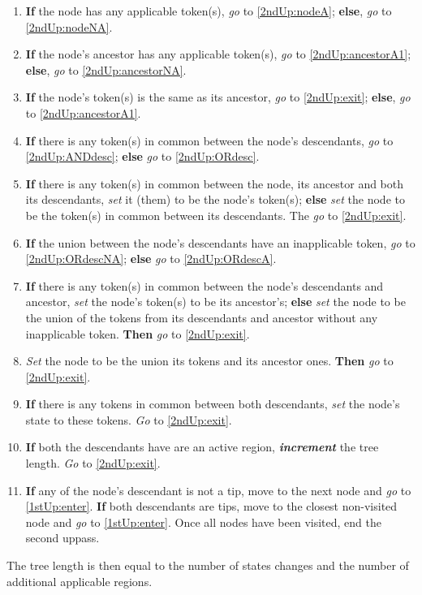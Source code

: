 \documentclass[a4paper,12pt]{article}
\begin{document}
\begin{enumerate}
    \item \label{2ndUp:enter} \textbf{If} the node has any applicable token(s), \textit{go} to \ref{2ndUp:nodeA}; \textbf{else}, \textit{go} to \ref{2ndUp:nodeNA}.
    \item \label{2ndUp:nodeA} \textbf{If} the node's ancestor has any applicable token(s), \textit{go} to \ref{2ndUp:ancestorA1}; \textbf{else}, \textit{go} to \ref{2ndUp:ancestorNA}.
    \item \label{2ndUp:ancestorA1} \textbf{If} the node's token(s) is the same as its ancestor, \textit{go} to \ref{2ndUp:exit}; \textbf{else}, \textit{go} to \ref{2ndUp:ancestorA1}.
    \item \label{2ndUp:ancestorA2} \textbf{If} there is any token(s) in common between the node's descendants, \textit{go} to \ref{2ndUp:ANDdesc}; \textbf{else} \textit{go} to \ref{2ndUp:ORdesc}.
    \item \label{2ndUp:ANDdesc} \textbf{If} there is any token(s) in common between the node, its ancestor and both its descendants, \textit{set} it (them) to be the node's token(s); \textbf{else} \textit{set} the node to be the token(s) in common between its descendants. The \textit{go} to \ref{2ndUp:exit}.
    \item \label{2ndUp:ORdesc} \textbf{If} the union between the node's descendants have an inapplicable token, \textit{go} to \ref{2ndUp:ORdescNA}; \textbf{else} \textit{go} to \ref{2ndUp:ORdescA}.
    \item \label{2ndUp:ORdescNA} \textbf{If} there is any token(s) in common between the node's descendants and ancestor, \textit{set} the node's token(s) to be its ancestor's; \textbf{else} \textit{set} the node to be the union of the tokens from its descendants and ancestor without any inapplicable token. \textbf{Then} \textit{go} to \ref{2ndUp:exit}.
    \item \label{2ndUp:ORdescA} \textit{Set} the node to be the union its tokens and its ancestor ones. \textbf{Then} \textit{go} to \ref{2ndUp:exit}.
    \item \label{2ndUp:ancestorNA} \textbf{If} there is any tokens in common between both descendants, \textit{set} the node's state to these tokens. \textit{Go} to \ref{2ndUp:exit}. %
    \item \label{2ndUp:nodeNA} \textbf{If} both the descendants have are an active region, \textbf{\textit{increment}} the tree length. \textit{Go} to \ref{2ndUp:exit}. %
    \item \label{2ndUp:exit} \textbf{If} any of the node's descendant is not a tip, move to the next node and \textit{go} to \ref{1stUp:enter}. \textbf{If} both descendants are tips, move to the closest non-visited node and \textit{go} to \ref{1stUp:enter}. Once all nodes have been visited, end the second uppass.
\end{enumerate}

The tree length is then equal to the number of states changes and the number of additional applicable regions.
\end{document}

